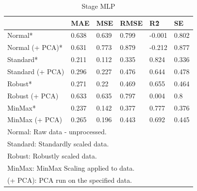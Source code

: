 \documentclass[conference]{IEEEtran}
\begin{document}
\begin{table}[H]
    \centering
    \caption{Stage MLP}
    \begin{adjustbox}{width=\columnwidth,center}
    \begin{tabular}{llllll}
        ~ & MAE & MSE & RMSE & R\^2 & SE \\ \hline
        Normal* & 0.638 & 0.639 & 0.799 & -0.001 & 0.802 \\ 
        Normal (+ PCA)* & 0.631 & 0.773 & 0.879 & -0.212 & 0.877 \\ 
        Standard* & 0.211 & 0.112 & 0.335 & 0.824 & 0.336 \\ 
        Standard (+ PCA) & 0.296 & 0.227 & 0.476 & 0.644 & 0.478 \\ 
        Robust*  & 0.271 & 0.22 & 0.469 & 0.655 & 0.464 \\ 
        Robust (+ PCA) & 0.633 & 0.635 & 0.797 & 0.004 & 0.8 \\ 
        MinMax* & 0.237 & 0.142 & 0.377 & 0.777 & 0.376 \\ 
        MinMax (+ PCA) & 0.265 & 0.196 & 0.443 & 0.692 & 0.445 \\ 
        \bottomrule
        \multicolumn{6}{l}{\footnotesize *Normal: Raw data - unprocessed.}\\
        \multicolumn{6}{l}{\footnotesize *Standard: Standardly scaled data.}\\
        \multicolumn{6}{l}{\footnotesize *Robust: Robustly scaled data.}\\
        \multicolumn{6}{l}{\footnotesize *MinMax: MinMax Scaling applied to data.}\\
        \multicolumn{6}{l}{\footnotesize *(+ PCA): PCA run on the specified data.}\\
    \end{tabular}
    \end{adjustbox}
\end{table}
\end{document}
